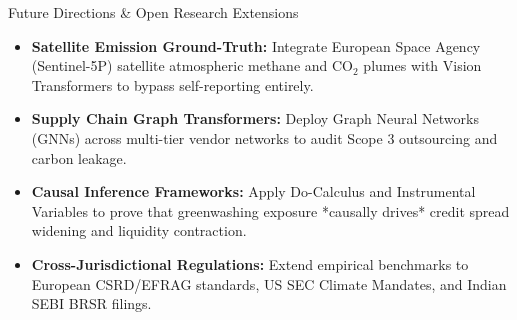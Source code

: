 \documentclass[aspectratio=169,10pt]{beamer}
\begin{document}
\begin{frame}[t]{Future Directions & Open Research Extensions}
\small
\begin{itemize}\setlength{\itemsep}{4pt}
  \item \textbf{Satellite Emission Ground-Truth:} Integrate European Space Agency (Sentinel-5P) satellite atmospheric methane and CO$_2$ plumes with Vision Transformers to bypass self-reporting entirely.
  \item \textbf{Supply Chain Graph Transformers:} Deploy Graph Neural Networks (GNNs) across multi-tier vendor networks to audit Scope 3 outsourcing and carbon leakage.
  \item \textbf{Causal Inference Frameworks:} Apply Do-Calculus and Instrumental Variables to prove that greenwashing exposure *causally drives* credit spread widening and liquidity contraction.
  \item \textbf{Cross-Jurisdictional Regulations:} Extend empirical benchmarks to European CSRD/EFRAG standards, US SEC Climate Mandates, and Indian SEBI BRSR filings.
\end{itemize}
\end{frame}
\end{document}
